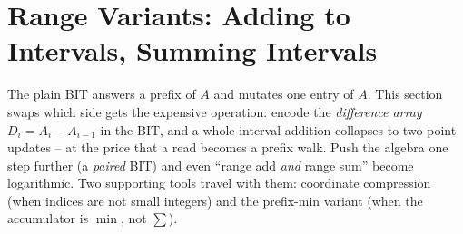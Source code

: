 \section{Range Variants: Adding to Intervals, Summing Intervals}\label{sec:c14-range}

\begin{previouslybox}
The plain BIT answers a prefix of \(A\) and mutates one entry of \(A\).
This section swaps which side gets the expensive operation: encode the
\emph{difference array} \(D_i=A_i-A_{i-1}\) in the BIT, and a whole-interval
addition collapses to two point updates -- at the price that a read becomes
a prefix walk.  Push the algebra one step further (a \emph{paired} BIT) and
even ``range add \emph{and} range sum'' become logarithmic.  Two supporting
tools travel with them: coordinate compression (when indices are not small
integers) and the prefix-min variant (when the accumulator is \(\min\), not
\(\sum\)).
\end{previouslybox}

